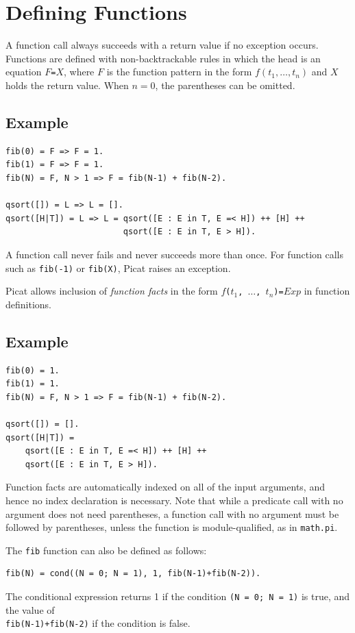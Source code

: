 \section{Defining Functions}
A function call always succeeds with a return value if no exception occurs. Functions are defined with non-backtrackable rules in which the head is an equation $F$\verb+=+$X$, where $F$ is the function pattern in the form $f(t_1, \ldots, t_n)$ and $X$ holds the return value. When $n = 0$, the parentheses can be omitted.

\subsection*{Example}
\begin{verbatim}
fib(0) = F => F = 1.
fib(1) = F => F = 1.
fib(N) = F, N > 1 => F = fib(N-1) + fib(N-2).

qsort([]) = L => L = [].
qsort([H|T]) = L => L = qsort([E : E in T, E =< H]) ++ [H] ++
                        qsort([E : E in T, E > H]).
\end{verbatim}
A function call never fails and never succeeds more than once. For function calls such as \texttt{fib(-1)} or \texttt{fib(X)}, Picat raises an exception. 

Picat allows inclusion of \emph{function facts} in the form {\tt $f$($t_1$, $\ldots$, $t_n$)\verb+=+$Exp$} in function definitions. 

\subsection*{Example}
\begin{verbatim}
fib(0) = 1.    
fib(1) = 1.
fib(N) = F, N > 1 => F = fib(N-1) + fib(N-2).

qsort([]) = [].
qsort([H|T]) =
    qsort([E : E in T, E =< H]) ++ [H] ++
    qsort([E : E in T, E > H]).
\end{verbatim}
Function facts are automatically indexed on all of the input arguments, and hence no index declaration is necessary. Note that while a predicate call with no argument does not need parentheses, a function call with no argument must be followed by parentheses, unless the function is module-qualified, as in \texttt{math.pi}.

The \texttt{fib} function can also be defined as follows:
\begin{verbatim}
fib(N) = cond((N = 0; N = 1), 1, fib(N-1)+fib(N-2)).
\end{verbatim}
The conditional expression returns 1 if the condition \texttt{(N = 0; N = 1)} is true, and the value of \\ \texttt{fib(N-1)+fib(N-2)} if the condition is false.

